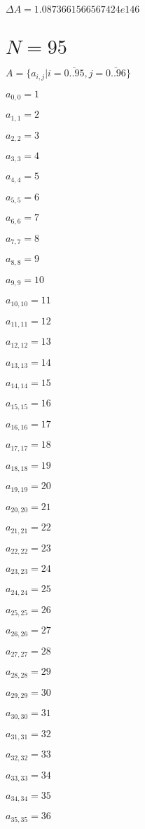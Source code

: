 \documentclass[a4paper,12pt]{article}
\begin{document}
$\Delta A = 1.0873661566567424e146$



\section{ $N = 95$ }
$A = \{ a _{ i, j } | i = \overline { 0..95 }, j = \overline { 0..96 } \}$

$a _{ 0, 0 } = 1$

$a _{ 1, 1 } = 2$

$a _{ 2, 2 } = 3$

$a _{ 3, 3 } = 4$

$a _{ 4, 4 } = 5$

$a _{ 5, 5 } = 6$

$a _{ 6, 6 } = 7$

$a _{ 7, 7 } = 8$

$a _{ 8, 8 } = 9$

$a _{ 9, 9 } = 10$

$a _{ 10, 10 } = 11$

$a _{ 11, 11 } = 12$

$a _{ 12, 12 } = 13$

$a _{ 13, 13 } = 14$

$a _{ 14, 14 } = 15$

$a _{ 15, 15 } = 16$

$a _{ 16, 16 } = 17$

$a _{ 17, 17 } = 18$

$a _{ 18, 18 } = 19$

$a _{ 19, 19 } = 20$

$a _{ 20, 20 } = 21$

$a _{ 21, 21 } = 22$

$a _{ 22, 22 } = 23$

$a _{ 23, 23 } = 24$

$a _{ 24, 24 } = 25$

$a _{ 25, 25 } = 26$

$a _{ 26, 26 } = 27$

$a _{ 27, 27 } = 28$

$a _{ 28, 28 } = 29$

$a _{ 29, 29 } = 30$

$a _{ 30, 30 } = 31$

$a _{ 31, 31 } = 32$

$a _{ 32, 32 } = 33$

$a _{ 33, 33 } = 34$

$a _{ 34, 34 } = 35$

$a _{ 35, 35 } = 36$
\end{document}
